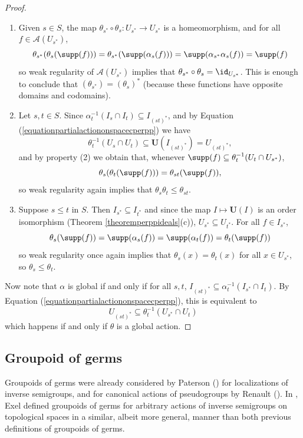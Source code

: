 \begin{proof}
\begin{enumerate}
\item[(i)] Given $s\in S$, the map $\theta_{s^*}\circ\theta_s:U_{s^*}\to U_{s^*}$ is a homeomorphism, and for all $f\in\mathcal{A}(U_{s^*})$,
\[\theta_{s^*}(\theta_s(\supp(f)))=\theta_{s^*}(\supp(\alpha_s(f)))=\supp(\alpha_{s^*}\alpha_s(f))=\supp(f)\]
so weak regularity of $\mathcal{A}(U_{s^*})$ implies that $\theta_{s^*}\circ\theta_s=\id_{U_{s^*}}$. This is enough to conclude that $(\theta_{s^*})=(\theta_s)^*$ (because these functions have opposite domains and codomains).
%
\item[(ii)] Let $s,t\in S$. Since $\alpha_t^{-1}(I_s\cap I_t)\subseteq I_{(st)^*}$, and by Equation (\ref{equationpartialactiononspacecperpp}) we have
\[\theta_t^{-1}(U_s\cap U_t)\subseteq\mathbf{U}(I_{(st)^*})=U_{(st)^*},\]
and by property (2) we obtain that, whenever $\supp(f)\subseteq\theta_t^{-1}(U_t\cap U_{s^*})$,
\[\theta_s(\theta_t(\supp(f)))=\theta_{st}(\supp(f)),\]
so weak regularity again implies that $\theta_s\theta_t\leq\theta_{st}$.
\item[(iii)] Suppose $s\leq t$ in $S$. Then $I_{s^*}\subseteq I_{t^*}$ and since the map $I\mapsto\mathbf{U}(I)$ is an order isomorphism (Theorem \ref{theoremperppideals}(c)), $U_{s^*}\subseteq U_{t^*}$. For all $f\in I_{s^*}$,
\[\theta_s(\supp(f))=\supp(\alpha_s(f))=\supp(\alpha_t(f))=\theta_t(\supp(f))\]
so weak regularity once again implies that $\theta_s(x)=\theta_t(x)$ for all $x\in U_{s^*}$, so $\theta_s\leq\theta_t$.
\end{enumerate}

Now note that $\alpha$ is global if and only if for all $s,t$, $I_{(st)^*}\subseteq\alpha_t^{-1}(I_{s^*}\cap I_t)$. By Equation (\ref{equationpartialactiononspacecperpp}), this is equivalent to
\[U_{(st)^*}\subseteq\theta_t^{-1}(U_{s^*}\cap U_t)\]
which happens if and only if $\theta$ is a global action.\qedhere
\end{proof}

\subsection{Groupoid of germs}\label{subsectiongroupoidofgerms}

Groupoids of germs were already considered by Paterson (\cite{MR1724106}) for localizations of inverse semigroups, and for canonical actions of pseudogroups by Renault (\cite{MR2460017}). In \cite{MR2419901}, Exel defined groupoids of germs for arbitrary actions of inverse semigroups on topological spaces in a similar, albeit more general, manner than both previous definitions of groupoids of germs.

